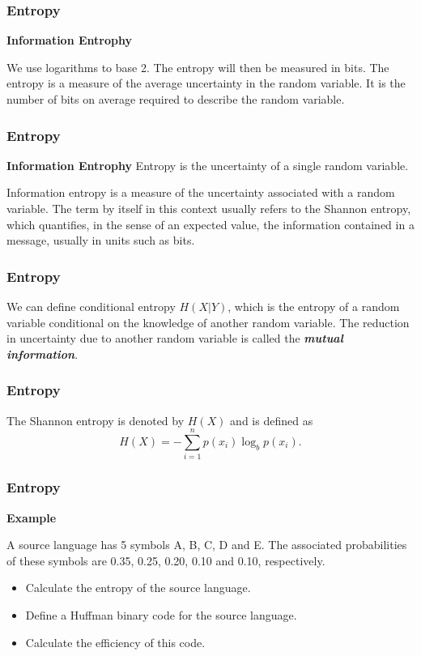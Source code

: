 \documentclass{beamer}
\begin{document}
	
\begin{frame}
	\large
	\frametitle{Entropy}
	\textbf{Information Entrophy}	

We use logarithms to base 2. The entropy will then be measured in
bits. The entropy is a measure of the average uncertainty in the
random variable. It is the number of bits on average required to
describe the random variable.

\end{frame}
\begin{frame}
	\large
	\frametitle{Entropy}
\textbf{Information Entrophy}
Entropy is the uncertainty of a single random variable.

Information entropy is a measure of the uncertainty associated
with a random variable. The term by itself in this context usually
refers to the Shannon entropy, which quantifies, in the sense of
an expected value, the information contained in a message, usually
in units such as bits.

\end{frame}
\begin{frame}
	\large
	\frametitle{Entropy}
 We can
 define conditional entropy $H(X|Y)$, which is the entropy of a
 random variable conditional on the knowledge of another random
 variable. The reduction in uncertainty due to another random
 variable is called the \textbf{\textit{mutual information}}.

\end{frame}
\begin{frame}
	\large
	\frametitle{Entropy}
The Shannon entropy is denoted by $H(X)$ and is defined as
\begin{equation}
   H(X) =   - \sum_{i=1}^np(x_i)\log_b p(x_i).
\end{equation}

\end{frame}
\begin{frame}
	\large
	\frametitle{Entropy}
\textbf{Example}

A source language has 5 symbols A, B, C, D and E.  The associated
probabilities of these symbols are 0.35, 0.25, 0.20, 0.10 and
0.10, respectively.

\begin{itemize}
\item Calculate the entropy of the source language. \item Define a
Huffman binary code for the source language. \item Calculate the
efficiency of this code.
\end{itemize}
\end{frame}
\end{document}
